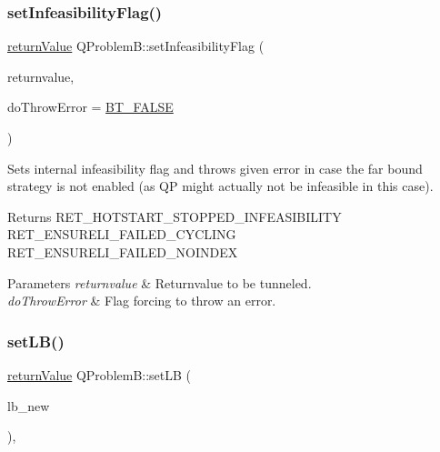 \subsubsection{\texorpdfstring{set\+Infeasibility\+Flag()}{setInfeasibilityFlag()}}
{\footnotesize\ttfamily \hyperlink{_message_handling_8hpp_a81d556f613bfbabd0b1f9488c0fa865e}{return\+Value} Q\+Problem\+B\+::set\+Infeasibility\+Flag (\begin{DoxyParamCaption}\item[{\hyperlink{_message_handling_8hpp_a81d556f613bfbabd0b1f9488c0fa865e}{return\+Value}}]{returnvalue,  }\item[{\hyperlink{_types_8hpp_a20f82124c82b6f5686a7fce454ef9089}{Boolean\+Type}}]{do\+Throw\+Error = {\ttfamily \hyperlink{_types_8hpp_a20f82124c82b6f5686a7fce454ef9089a85b8a20e72a8bea5dd10a6007fe3071e}{B\+T\+\_\+\+F\+A\+L\+SE}} }\end{DoxyParamCaption})\hspace{0.3cm}{\ttfamily [protected]}}

Sets internal infeasibility flag and throws given error in case the far bound strategy is not enabled (as QP might actually not be infeasible in this case). \begin{DoxyReturn}{Returns}
R\+E\+T\+\_\+\+H\+O\+T\+S\+T\+A\+R\+T\+\_\+\+S\+T\+O\+P\+P\+E\+D\+\_\+\+I\+N\+F\+E\+A\+S\+I\+B\+I\+L\+I\+TY ~\newline
 R\+E\+T\+\_\+\+E\+N\+S\+U\+R\+E\+L\+I\+\_\+\+F\+A\+I\+L\+E\+D\+\_\+\+C\+Y\+C\+L\+I\+NG ~\newline
 R\+E\+T\+\_\+\+E\+N\+S\+U\+R\+E\+L\+I\+\_\+\+F\+A\+I\+L\+E\+D\+\_\+\+N\+O\+I\+N\+D\+EX 
\end{DoxyReturn}

\begin{DoxyParams}{Parameters}
{\em returnvalue} & Returnvalue to be tunneled. \\
\hline
{\em do\+Throw\+Error} & Flag forcing to throw an error. \\
\hline
\end{DoxyParams}
\mbox{\label{class_q_problem_b_a7d3cb375ddce99f8728a9be54207d542}} 
\subsubsection{\texorpdfstring{set\+L\+B()}{setLB()}\hspace{0.1cm}{\footnotesize\ttfamily [1/2]}}
{\footnotesize\ttfamily \hyperlink{_message_handling_8hpp_a81d556f613bfbabd0b1f9488c0fa865e}{return\+Value} Q\+Problem\+B\+::set\+LB (\begin{DoxyParamCaption}\item[{const \hyperlink{qp_o_a_s_e_s__wrapper_8h_a0d00e2b3dfadee81331bbb39068570c4}{real\+\_\+t} $\ast$const}]{lb\+\_\+new }\end{DoxyParamCaption})\hspace{0.3cm}{\ttfamily [inline]}, {\ttfamily [protected]}}

